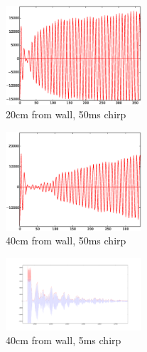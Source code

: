 \begin{figure}[H]
\centering
\includegraphics[width=0.45\textwidth]{./fig/20cm.eps}
\caption{20cm from wall, 50ms chirp}
\end{figure}

\begin{figure}[H]
\centering
\includegraphics[width=0.45\textwidth]{./fig/40cm.eps}
\caption{40cm from wall, 50ms chirp}
\end{figure}

\begin{figure}[H]
\centering
\includegraphics[width=0.45\textwidth]{./fig/inroom.pdf}
\caption{40cm from wall, 5ms chirp}
\end{figure}









